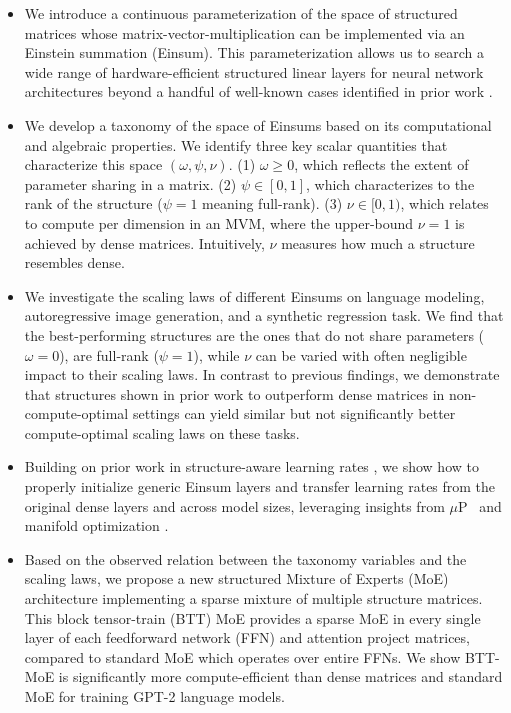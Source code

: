 \documentclass{article}
\newcommand{\mup}{$\mu$P}
\begin{document}
\begin{itemize}
  \item We introduce a continuous parameterization of the space of structured matrices whose matrix-vector-multiplication can be    implemented via an Einstein summation (Einsum).
    This parameterization allows us to search a wide range of hardware-efficient structured linear layers for neural network architectures beyond a handful of well-known cases identified in prior work \citep{dao2022monarch, fu2023mixer, qiu2024compute}.

    \item We develop a taxonomy of the space of Einsums based on its computational and algebraic properties.
      We identify three key scalar quantities that characterize this space $(\omega, \psi, \nu)$.
      (1) $\omega \geq 0$, which reflects the extent of parameter sharing in a matrix.
      (2) $\psi \in [0, 1]$, which characterizes to the rank of the structure ($\psi=1$ meaning full-rank).
      (3) $\nu \in [0,1)$, which relates to compute per dimension in an MVM, where the upper-bound $\nu = 1$ is achieved by dense matrices. Intuitively, $\nu$ measures how much a structure resembles dense.

    \item We investigate the scaling laws of different Einsums on language modeling, autoregressive image generation, and a synthetic regression task. We find that the best-performing structures are the ones that do not share parameters ($\omega=0$), are full-rank ($\psi=1$), while $\nu$ can be varied with often negligible impact to their scaling laws. In contrast to previous findings,
      we demonstrate that structures shown in prior work \citep{dao2022monarch,fu2023mixer,qiu2024compute} to outperform dense matrices in non-compute-optimal settings can yield similar but not significantly better compute-optimal scaling laws on these tasks.
  \item Building on prior work in structure-aware learning rates \citep{qiu2024compute}, we show how to properly initialize generic Einsum layers and transfer learning rates from the original dense layers and across model sizes, leveraging insights from \mup~\citep{yang2023spectral,yang2021infty} and manifold optimization \citep{bonnabel2011rsgd}.
  \item Based on the observed relation between the taxonomy variables and the scaling laws, we propose a new structured Mixture of Experts (MoE) architecture implementing a sparse mixture of multiple structure matrices. This block tensor-train (BTT) MoE provides a sparse MoE in every single layer of each feedforward network (FFN) and attention project matrices, compared to standard MoE which operates over entire FFNs. We show BTT-MoE is significantly more compute-efficient than dense matrices and standard MoE for training GPT-2 language models.
\end{itemize}
\end{document}
